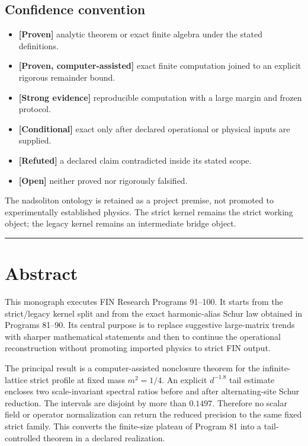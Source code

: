 \documentclass[11pt,a4paper,openany]{report}
\newcommand{\statusProven}{\textcolor{fingreen}{[Proven]}}
\newcommand{\statusComputer}{\textcolor{fingreen}{[Proven, computer-assisted]}}
\newcommand{\statusStrong}{\textcolor{finblue}{[Strong evidence]}}
\newcommand{\statusConditional}{\textcolor{finorange}{[Conditional]}}
\newcommand{\statusRefuted}{\textcolor{finred}{[Refuted]}}
\newcommand{\statusOpen}{\textcolor{finviolet}{[Open]}}
\begin{document}
\tableofcontents
\clearpage
{}

\section{Confidence convention}

\begin{itemize}
\item 
\textbf{\statusProven{}} analytic theorem or exact finite algebra under the stated definitions.

\item 
\textbf{\statusComputer{}} exact finite computation joined to an explicit rigorous remainder bound.

\item 
\textbf{\statusStrong{}} reproducible computation with a large margin and frozen protocol.

\item 
\textbf{\statusConditional{}} exact only after declared operational or physical inputs are supplied.

\item 
\textbf{\statusRefuted{}} a declared claim contradicted inside its stated scope.

\item 
\textbf{\statusOpen{}} neither proved nor rigorously falsified.

\end{itemize}

The nadsoliton ontology is retained as a project premise, not promoted to experimentally established physics. The strict kernel remains the strict working object; the legacy kernel remains an intermediate bridge object.

\par\medskip\hrule\medskip

\chapter{Abstract}

This monograph executes FIN Research Programs 91--100. It starts from the strict/\allowbreak{}legacy kernel split and from the exact harmonic-alias Schur law obtained in Programs 81--90. Its central purpose is to replace suggestive large-matrix trends with sharper mathematical statements and then to continue the operational reconstruction without promoting imported physics to strict FIN output.

The principal result is a computer-assisted nonclosure theorem for the infinite-lattice strict profile at fixed mass \(m^2=1/4\). An explicit \(d^{-1.8}\) tail estimate encloses two scale-invariant spectral ratios before and after alternating-site Schur reduction. The intervals are disjoint by more than \(0.1497\). Therefore no scalar field or operator normalization can return the reduced precision to the same fixed strict family. This converts the finite-size plateau of Program 81 into a tail-controlled theorem in a declared realization.
\end{document}
